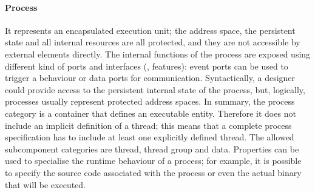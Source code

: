 \paragraph{Process} It represents an encapsulated execution unit; the address space, the persistent state and all internal resources are all protected, and they are not accessible by external elements directly. The internal functions of the process are exposed using different kind of ports and interfaces (\ie, features): event ports can be used to trigger a behaviour or data ports for communication. Syntactically, a designer could provide access to the persistent internal state of the process, but, logically, processes usually represent protected address spaces. In summary, the process category is a container that defines an executable entity. Therefore it does not include an implicit definition of a thread; this means that a complete process specification has to include at least one explicitly defined thread. The allowed subcomponent categories are thread, thread group and data. Properties can be used to specialise the runtime behaviour of a process; for example, it is possible to specify the source code associated with the process or even the actual binary that will be executed. 

